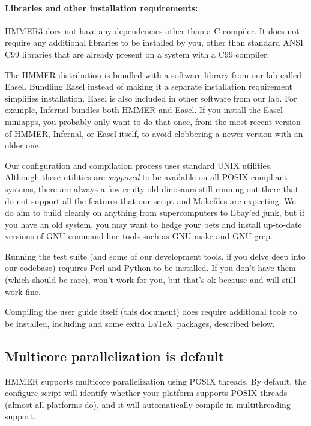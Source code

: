 \paragraph{Libraries and other installation requirements:}
HMMER3 does not have any dependencies other than a C compiler.  It
does not require any additional libraries to be installed by you,
other than standard ANSI C99 libraries that are already present on a
system with a C99 compiler.

The HMMER distribution is bundled with a software library from our lab
called Easel.
Bundling Easel instead of making it a separate installation
requirement simplifies installation. Easel is also included in other
software from our lab. For example,
Infernal
bundles both HMMER and Easel. If you install the Easel miniapps, you
probably only want to do that once, from the most recent version of
HMMER, Infernal, or Easel itself, to avoid clobbering a newer version
with an older one.

Our configuration and compilation process uses standard UNIX
utilities. Although these utilities are \emph{supposed} to be
available on all POSIX-compliant systems, there are always a few
crufty old dinosaurs still running out there that do not support all
the features that our  script and Makefiles are
expecting. We do aim to build cleanly on anything from supercomputers
to Ebay'ed junk, but if you have an old system, you may want to hedge
your bets and install up-to-date versions of GNU command line tools
such as GNU make and GNU grep.

Running the test suite (and some of our development tools, if you
delve deep into our codebase) requires Perl and Python to be
installed.  If you don't have them (which should be rare),  won't work for you, but that's ok because  and
 will still work fine.

Compiling the user guide itself (this document) does require
additional tools to be installed, including  and some extra
\LaTeX\ packages, described below.


\subsection{Multicore parallelization is default}

HMMER supports multicore parallelization using POSIX threads. By
default, the configure script will identify whether your platform
supports POSIX threads (almost all platforms do), and it will
automatically compile in multithreading support.

